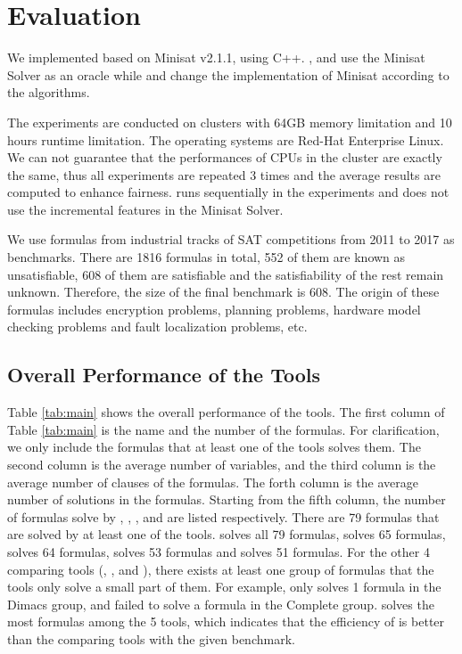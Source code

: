\section{Evaluation} \label{sec:expr}
We implemented \tool based on Minisat v2.1.1, using C++. \tool, \ctool and \bc use the Minisat Solver as an oracle while \nbc and \bdd change the implementation of Minisat according to the algorithms.

The experiments are conducted on clusters with 64GB memory limitation and 10 hours runtime limitation. 
The operating systems are Red-Hat Enterprise Linux. We can not guarantee that the performances of CPUs in the cluster are exactly the same, thus all experiments are repeated 3 times and the average results are computed to enhance fairness. \tool runs sequentially in the experiments and does not use the incremental features in the Minisat Solver.

We use formulas from industrial tracks of SAT competitions from 2011 to 2017 as benchmarks. There are 1816 formulas in total, 552 of them are known as unsatisfiable, 608 of them are satisfiable and the satisfiability of the rest remain unknown. Therefore, the size of the final benchmark is 608. The origin of these formulas includes encryption problems, planning problems, hardware model checking problems and fault localization problems, etc.

\subsection{Overall Performance of the Tools}
Table \ref{tab:main} shows the overall performance of the tools. The first column of Table \ref{tab:main} is the name and the number of the formulas. For clarification, we only include the formulas that at least one of the tools solves them. The second column is the average number of variables, and the third column is the average number of clauses of the formulas. The forth column is the average number of solutions in the formulas. Starting from the fifth column, the number of formulas solve by \tool, \ctool, \bc, \nbc and \bdd are listed respectively.
There are 79 formulas that are solved by at least one of the tools. \tool solves all 79 formulas, \ctool solves 65 formulas, \bc solves 64 formulas, \nbc solves 53 formulas and \bdd solves 51 formulas. For the other 4 comparing tools (\ctool, \bc, \nbc and \bdd), there exists at least one group of formulas that the tools only solve a small part of them. For example, \nbc only solves 1 formula in the Dimacs group, and \ctool failed to solve a formula in the Complete group.
\tool solves the most formulas among the 5 tools, which indicates that the efficiency of \tool is better than the comparing tools with the given benchmark.

